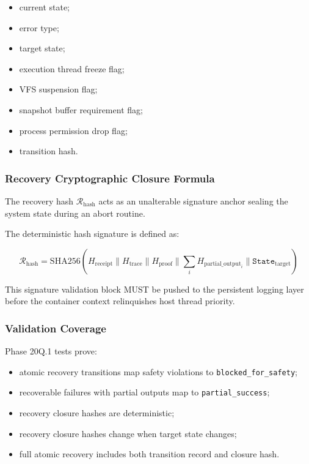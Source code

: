 \begin{itemize}
  \item current state;
  \item error type;
  \item target state;
  \item execution thread freeze flag;
  \item VFS suspension flag;
  \item snapshot buffer requirement flag;
  \item process permission drop flag;
  \item transition hash.
\end{itemize}

\subsubsection{Recovery Cryptographic Closure Formula}

The recovery hash $\mathcal{R}_{\mathrm{hash}}$ acts as an unalterable signature anchor sealing the system state during an abort routine.

The deterministic hash signature is defined as:

\begin{equation}
\mathcal{R}_{\mathrm{hash}}
=
\mathrm{SHA256}
(
H_{\mathrm{receipt}}
\parallel
H_{\mathrm{trace}}
\parallel
H_{\mathrm{proof}}
\parallel
\sum_i H_{\mathrm{partial\_output}_i}
\parallel
\mathtt{State}_{\mathrm{target}}
)
\end{equation}

This signature validation block MUST be pushed to the persistent logging layer before the container context relinquishes host thread priority.

\subsubsection{Validation Coverage}

Phase 20Q.1 tests prove:

\begin{itemize}
  \item atomic recovery transitions map safety violations to \texttt{blocked\_for\_safety};
  \item recoverable failures with partial outputs map to \texttt{partial\_success};
  \item recovery closure hashes are deterministic;
  \item recovery closure hashes change when target state changes;
  \item full atomic recovery includes both transition record and closure hash.
\end{itemize}

